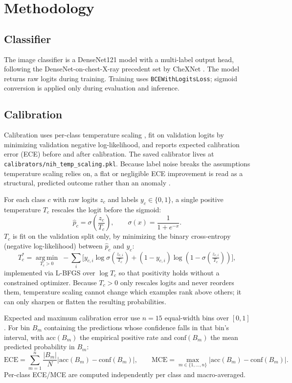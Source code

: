 \section{Methodology}

\subsection{Classifier}

The image classifier is a DenseNet121 model with a multi-label output head, following the DenseNet-on-chest-X-ray precedent set by CheXNet \citep{rajpurkar2017chexnet}. The model returns raw logits during training. Training uses \texttt{BCEWithLogitsLoss}; sigmoid conversion is applied only during evaluation and inference.

\subsection{Calibration}

Calibration uses per-class temperature scaling \citep{guo2017calibration}, fit on validation logits by minimizing validation negative log-likelihood, and reports expected calibration error (ECE) before and after calibration. The saved calibrator lives at \texttt{calibrators/nih\_temp\_scaling.pkl}. Because label noise breaks the assumptions temperature scaling relies on, a flat or negligible ECE improvement is read as a structural, predicted outcome rather than an anomaly \citep{wu2026transts}.

For each class $c$ with raw logits $z_c$ and labels $y_c \in \{0, 1\}$, a single positive
temperature $T_c$ rescales the logit before the sigmoid:
\[
  \hat{p}_c = \sigma\!\left(\frac{z_c}{T_c}\right), \qquad \sigma(x) = \frac{1}{1 + e^{-x}}.
\]
$T_c$ is fit on the validation split only, by minimizing the binary cross-entropy
(negative log-likelihood) between $\hat{p}_c$ and $y_c$:
\[
  T_c^{*} = \operatorname*{arg\,min}_{T_c > 0} \; -\sum_{i} \Big[ y_{c,i} \log \sigma\!\left(\tfrac{z_{c,i}}{T_c}\right) + (1 - y_{c,i}) \log\!\left(1 - \sigma\!\left(\tfrac{z_{c,i}}{T_c}\right)\right) \Big],
\]
implemented via L-BFGS over $\log T_c$ so that positivity holds without a constrained
optimizer. Because $T_c > 0$ only rescales logits and never reorders them, temperature
scaling cannot change which examples rank above others; it can only sharpen or flatten
the resulting probabilities.

Expected and maximum calibration error use $n = 15$ equal-width bins over $[0, 1]$. For
bin $B_m$ containing the predictions whose confidence falls in that bin's interval, with
$\mathrm{acc}(B_m)$ the empirical positive rate and $\mathrm{conf}(B_m)$ the mean
predicted probability in $B_m$:
\[
  \mathrm{ECE} = \sum_{m=1}^{n} \frac{|B_m|}{N} \left| \mathrm{acc}(B_m) - \mathrm{conf}(B_m) \right|,
  \qquad
  \mathrm{MCE} = \max_{m \in \{1, \ldots, n\}} \left| \mathrm{acc}(B_m) - \mathrm{conf}(B_m) \right|.
\]
Per-class ECE/MCE are computed independently per class and macro-averaged.

